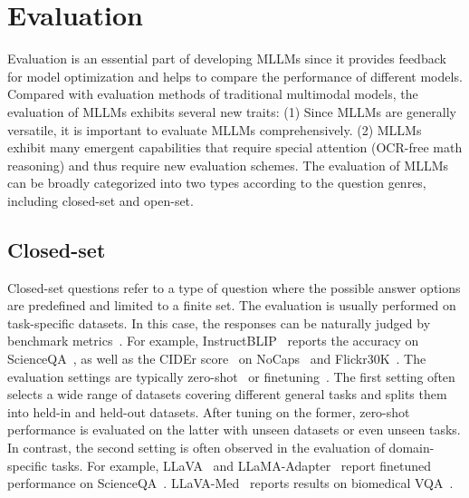 \section{Evaluation}
\label{sec:mllm_eval}
Evaluation is an essential part of developing MLLMs since it provides feedback for model optimization and helps to compare the performance of different models. Compared with evaluation methods of traditional multimodal models, the evaluation of MLLMs exhibits several new traits: (1) Since MLLMs are generally versatile, it is important to evaluate MLLMs comprehensively. (2) MLLMs exhibit many emergent capabilities that require special attention (\eg OCR-free math reasoning) and thus require new evaluation schemes.
The evaluation of MLLMs can be broadly categorized into two types according to the question genres, including closed-set and open-set. 

\subsection{Closed-set}
Closed-set questions refer to a type of question where the possible answer options are predefined and limited to a finite set. 
The evaluation is usually performed on task-specific datasets. 
In this case, the responses can be naturally judged by benchmark metrics~\cite{instructblip, llava, x-llm, multiinstruct, llama-adapter, llama-adapter-v2, chatbridge, lavin}. 
For example, InstructBLIP~\cite{instructblip} reports the accuracy on ScienceQA~\cite{scienceqa}, as well as the CIDEr score~\cite{vedantam2015cider} on NoCaps~\cite{agrawal2019nocaps} and Flickr30K~\cite{young2014image}. 
The evaluation settings are typically zero-shot~\cite{instructblip, multiinstruct, chatbridge, m3it} or finetuning~\cite{instructblip, llava, x-llm, llama-adapter, llama-adapter-v2, lavin, llava-med, m3it}. 
The first setting often selects a wide range of datasets covering different general tasks and splits them into held-in and held-out datasets. 
After tuning on the former, zero-shot performance is evaluated on the latter with unseen datasets or even unseen tasks. 
In contrast, the second setting is often observed in the evaluation of domain-specific tasks. 
For example, LLaVA~\cite{llava} and LLaMA-Adapter~\cite{llama-adapter} report finetuned performance on ScienceQA~\cite{scienceqa}. 
LLaVA-Med~\cite{llava-med} reports results on biomedical VQA~\cite{he2020pathvqa, lau2018dataset, liu2021slake}.

